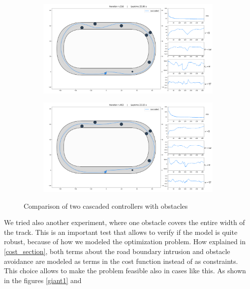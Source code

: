 \documentclass[a4paper, onecolumn, 11pt]{article}
\begin{document}
\begin{figure}[H]
    \centering
    \begin{subfigure}{0.9\textwidth}
        \centering
        \includegraphics[width=\textwidth]{assets/obstacles1_ippodromo.png}
        \label{obs1}
    \end{subfigure}
    \begin{subfigure}{0.9\textwidth}
        \centering
        \includegraphics[width=\textwidth]{assets/obstacle2_ippodromo.png}
    \end{subfigure}
    \caption[short]{Comparison of two cascaded controllers with obstacles}
\end{figure}
We tried also another experiment, where one obstacle covers the entire width of the 
track. This is an important test that allows to verify if the model is quite robust,
because of how we modeled the optimization problem. How explained in \ref{cost_section},
both terms about the road boundary intrusion and obstacle avoidance are modeled
as terms in the cost function instead of as constraints. This choice allows to make the
problem feasible also in cases like this. As shown in the figures \ref{giant1} and 
\end{document}
